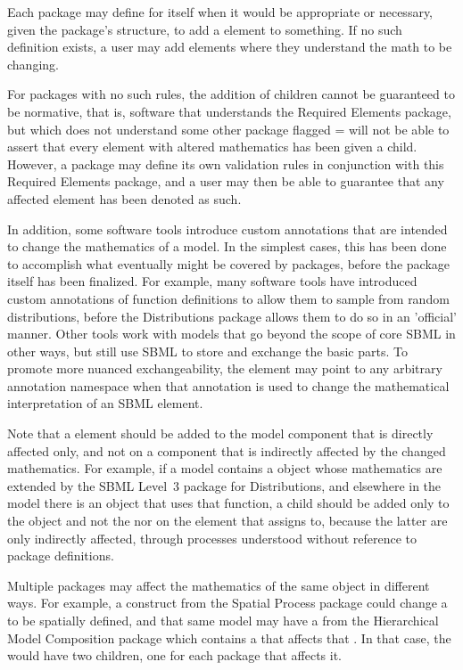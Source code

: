 Each package may define for itself when it would be appropriate or necessary, given the package's structure, to add a \ChangedMath element to something.  If no such definition exists, a user may add \ChangedMath elements where they understand the math to be changing.

For packages with no such rules, the addition of \ChangedMath children cannot be guaranteed to be normative, that is, software that understands the Required Elements package, but which does not understand some other package flagged = will not be able to assert that every element with altered mathematics has been given a \ChangedMath child.  However, a package may define its own validation rules in conjunction with this Required Elements package, and a user may then be able to guarantee that any affected element has been denoted as such.

In addition, some software tools introduce custom annotations that are intended to change the mathematics of a model.  In the simplest cases, this has been done to accomplish what eventually might be covered by packages, before the package itself has been finalized.  For example, many software tools have introduced custom annotations of function definitions to allow them to sample from random distributions, before the Distributions package allows them to do so in an 'official' manner.  Other tools work with models that go beyond the scope of core SBML in other ways, but still use SBML to store and exchange the basic parts.  To promote more nuanced exchangeability, the \ChangedMath element may point to any arbitrary annotation namespace when that annotation is used to change the mathematical interpretation of an SBML element.

Note that a \ChangedMath element should be added to the model component that is directly affected only, and not on a component that is indirectly affected by the changed mathematics.  For example, if a model contains a \FunctionDefinition object whose mathematics are extended by the SBML Level~3 package for Distributions, and elsewhere in the model there is an \InitialAssignment object that uses that function, a \ChangedMath child should be added only to the \FunctionDefinition object and not the \InitialAssignment nor on the element that assigns to, because the latter are only indirectly affected, through processes understood without reference to package definitions.

Multiple packages may affect the mathematics of the same object in different ways.  For example, a construct from the Spatial Process package could change a \Species to be spatially defined, and that same model may have a \Submodel from the Hierarchical Model Composition package which contains a \Reaction that affects that \Species.  In that case, the \Species would have two \ChangedMath children, one for each package that affects it.

